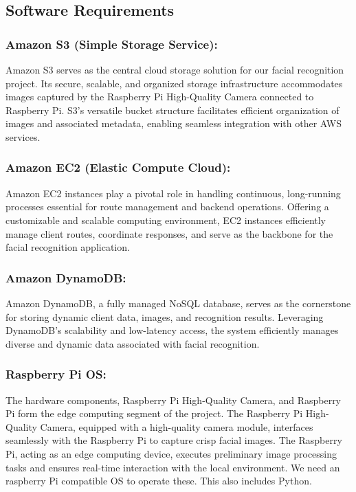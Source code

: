 \documentclass[11pt]{article}
\begin{document}
    \begin{multicols}{2}
\subsection{Software Requirements}

\subsubsection{Amazon S3 (Simple Storage Service):}
Amazon S3 serves as the central cloud storage solution for our facial recognition project. Its secure, scalable, and organized storage infrastructure accommodates images captured by the Raspberry Pi High-Quality Camera connected to Raspberry Pi. S3's versatile bucket structure facilitates efficient organization of images and associated metadata, enabling seamless integration with other AWS services.

\subsubsection{Amazon EC2 (Elastic Compute Cloud):}
Amazon EC2 instances play a pivotal role in handling continuous, long-running processes essential for route management and backend operations. Offering a customizable and scalable computing environment, EC2 instances efficiently manage client routes, coordinate responses, and serve as the backbone for the facial recognition application.

\subsubsection{Amazon DynamoDB:}
Amazon DynamoDB, a fully managed NoSQL database, serves as the cornerstone for storing dynamic client data, images, and recognition results. Leveraging DynamoDB's scalability and low-latency access, the system efficiently manages diverse and dynamic data associated with facial recognition.

\subsubsection{Raspberry Pi OS:}
The hardware components, Raspberry Pi High-Quality Camera, and Raspberry Pi form the edge computing segment of the project. The Raspberry Pi High-Quality Camera, equipped with a high-quality camera module, interfaces seamlessly with the Raspberry Pi to capture crisp facial images. The Raspberry Pi, acting as an edge computing device, executes preliminary image processing tasks and ensures real-time interaction with the local environment. We need an raspberry Pi compatible OS to operate these. This also includes Python. 

\end{multicols}
\end{document}
